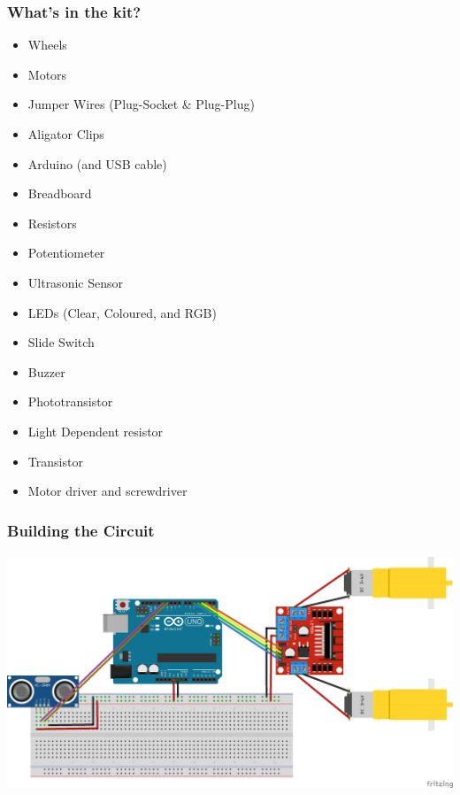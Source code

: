 \documentclass[compress]{beamer}
\begin{document}
\begin{frame}[fragile]
    \frametitle{What's in the kit?}
    \begin{itemize}
        \item <1-> {\color{NordRed}Wheels}
        \item <2-> {\color{NordRed}Motors}
        \item <3-> {\color{NordRed}Jumper Wires (Plug-Socket \& Plug-Plug)}
        \item <4-> {\color{NordRed} Aligator Clips}
        \item <5-> {\color{NordRed} Arduino (and USB cable)}
        \item <6-> {\color{NordRed} Breadboard}
        \item <7-> {\color{NordRed} Resistors}
        \item <8-> Potentiometer
        \item <9-> {\color{NordRed}Ultrasonic Sensor}
        \item <10-> LEDs (Clear, Coloured, and RGB)
        \item <11-> Slide Switch
        \item <12-> Buzzer
        \item <13-> Phototransistor
        \item <14-> Light Dependent resistor
        \item <15-> Transistor
        \item <16-> {\color{NordRed}Motor driver and screwdriver}
    \end{itemize}
\end{frame}

\begin{frame}[fragile]
    \frametitle{Building the Circuit}
    \includegraphics[height=7cm]{pictures/circuit.png}
\end{frame}
\end{document}
